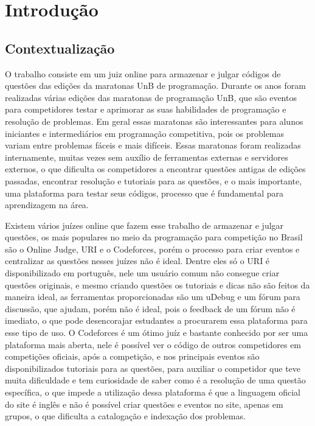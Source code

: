 \chapter[Introdução]{Introdução}

\section{Contextualização}

O trabalho consiste em um juiz online para armazenar e julgar códigos de questões das edições da
maratonas UnB de programação.
Durante os anos foram realizadas várias edições das maratonas de programação UnB, que são eventos
para competidores testar e aprimorar as suas habilidades de programação e resolução de problemas.
Em geral essas maratonas são interessantes para alunos iniciantes e intermediários em programação
competitiva, pois os problemas variam entre problemas fáceis e mais difíceis. Essas maratonas foram
realizadas internamente, muitas vezes sem auxílio de ferramentas externas e servidores externos, o
que dificulta os competidores a encontrar questões antigas de edições passadas, encontrar resolução
e tutoriais para as questões, e o mais importante, uma plataforma para testar seus códigos,
processo que é fundamental para aprendizagem na área.

Existem vários juízes online que fazem esse trabalho de armazenar e julgar questões, os mais
populares no meio da programação para competição no Brasil são o Online Judge, URI e o Codeforces,
porém o processo para criar eventos e centralizar as questões nesses juízes não é ideal. Dentre
eles só o URI é disponibilizado em português, nele um usuário comum não consegue criar questões
originais, e mesmo criando questões os tutoriais e dicas não são feitos da maneira ideal, as
ferramentas proporcionadas são um uDebug e um fórum para discussão, que ajudam, porém não é ideal,
pois o feedback de um fórum não é imediato, o que pode desencorajar estudantes a procurarem essa
plataforma para esse tipo de uso. O Codeforces é um ótimo juíz e bastante conhecido por ser uma
plataforma mais aberta, nele é possível ver o código de outros competidores em competições
oficiais, após a competição, e nos principais eventos são disponibilizados tutoriais para as
questões, para auxiliar o competidor que teve muita dificuldade e tem curiosidade de saber como é a
resolução de uma questão específica, o que impede a utilização dessa plataforma é que a linguagem
oficial do site é inglês e não é possível criar questões e eventos no site, apenas em grupos, o que
dificulta a catalogação e indexação dos problemas.

